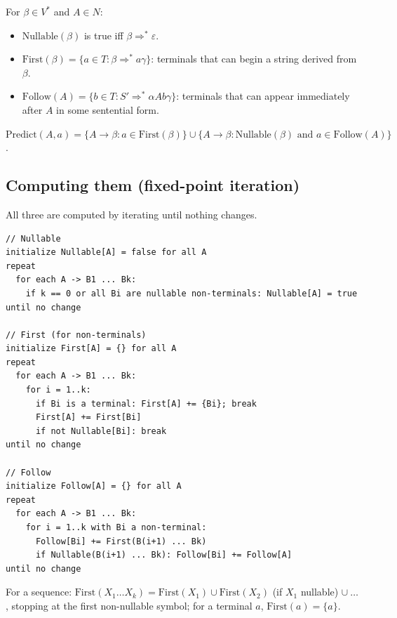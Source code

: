 \begin{definition}
For $\beta\in V^*$ and $A\in N$:
\begin{itemize}
  \item $\mathrm{Nullable}(\beta)$ is true iff $\beta \Rightarrow^* \varepsilon$.
  \item $\mathrm{First}(\beta) = \{ a\in T : \beta \Rightarrow^* a\gamma \}$: terminals that can
        begin a string derived from $\beta$.
  \item $\mathrm{Follow}(A) = \{ b \in T : S' \Rightarrow^* \alpha A b \gamma\}$: terminals that
        can appear immediately after $A$ in some sentential form.
\end{itemize}
\end{definition}

\begin{definition}
$\mathrm{Predict}(A, a) = \{A\to\beta : a\in\mathrm{First}(\beta)\} \cup
\{A\to\beta : \mathrm{Nullable}(\beta) \text{ and } a \in \mathrm{Follow}(A)\}$.
\end{definition}

\subsection{Computing them (fixed-point iteration)}

All three are computed by iterating until nothing changes.

\begin{lstlisting}[style=cpp]
// Nullable
initialize Nullable[A] = false for all A
repeat
  for each A -> B1 ... Bk:
    if k == 0 or all Bi are nullable non-terminals: Nullable[A] = true
until no change

// First (for non-terminals)
initialize First[A] = {} for all A
repeat
  for each A -> B1 ... Bk:
    for i = 1..k:
      if Bi is a terminal: First[A] += {Bi}; break
      First[A] += First[Bi]
      if not Nullable[Bi]: break
until no change

// Follow
initialize Follow[A] = {} for all A
repeat
  for each A -> B1 ... Bk:
    for i = 1..k with Bi a non-terminal:
      Follow[Bi] += First(B(i+1) ... Bk)
      if Nullable(B(i+1) ... Bk): Follow[Bi] += Follow[A]
until no change
\end{lstlisting}

For a sequence: $\mathrm{First}(X_1\dots X_k) = \mathrm{First}(X_1) \cup \mathrm{First}(X_2)$
(if $X_1$ nullable) $\cup\ \dots$, stopping at the first non-nullable symbol; for a terminal
$a$, $\mathrm{First}(a) = \{a\}$.

